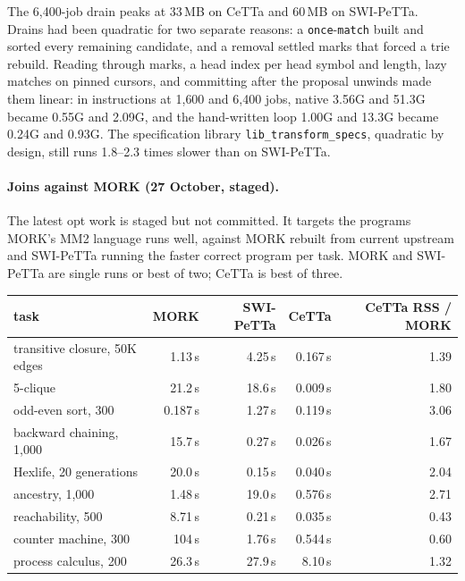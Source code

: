 \documentclass[11pt]{article}
\newcommand{\code}[1]{\texttt{#1}}
\newcommand{\PeTTa}{\textup{PeTTa}}
\newcommand{\CeTTa}{\textup{CeTTa}}
\begin{document}
\noindent
The 6{,}400-job drain peaks at 33\,MB on \CeTTa{} and 60\,MB on
SWI-\PeTTa{}.  Drains had been quadratic for two separate reasons: a
\code{once}-\code{match} built and sorted every remaining candidate, and a
removal settled marks that forced a trie rebuild.  Reading through marks, a
head index per head symbol and length, lazy matches on pinned cursors, and
committing after the proposal unwinds made them linear: in instructions at
1{,}600 and 6{,}400 jobs, native 3.56G and 51.3G became 0.55G and 2.09G, and
the hand-written loop 1.00G and 13.3G became 0.24G and 0.93G.  The
specification library \code{lib\_transform\_specs}, quadratic by design, still
runs 1.8--2.3 times slower than on SWI-\PeTTa{}.

\paragraph{Joins against MORK (27 October, staged).}  The latest opt work is
staged but not committed.  It targets the programs MORK's MM2 language runs
well, against MORK rebuilt from current upstream and SWI-\PeTTa{} running the
faster correct program per task.  MORK and SWI-\PeTTa{} are single runs or
best of two; \CeTTa{} is best of three.

\begin{center}
\small
\begin{tabular}{@{}lrrrr@{}}
\toprule
task & MORK & SWI-\PeTTa{} & \CeTTa{} & \CeTTa{} RSS / MORK \\
\midrule
transitive closure, 50K edges & 1.13\,s & 4.25\,s & 0.167\,s & 1.39 \\
5-clique & 21.2\,s & 18.6\,s & 0.009\,s & 1.80 \\
odd-even sort, 300 & 0.187\,s & 1.27\,s & 0.119\,s & 3.06 \\
backward chaining, 1{,}000 & 15.7\,s & 0.27\,s & 0.026\,s & 1.67 \\
Hexlife, 20 generations & 20.0\,s & 0.15\,s & 0.040\,s & 2.04 \\
ancestry, 1{,}000 & 1.48\,s & 19.0\,s & 0.576\,s & 2.71 \\
reachability, 500 & 8.71\,s & 0.21\,s & 0.035\,s & 0.43 \\
counter machine, 300 & 104\,s & 1.76\,s & 0.544\,s & 0.60 \\
process calculus, 200 & 26.3\,s & 27.9\,s & 8.10\,s & 1.32 \\
\bottomrule
\end{tabular}
\end{center}
\end{document}
